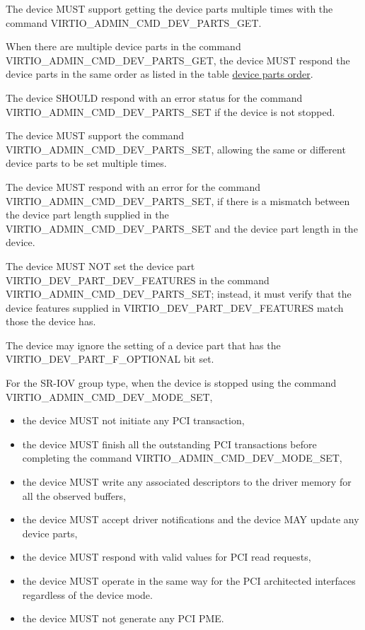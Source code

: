 The device MUST support getting the device parts multiple times
with the command VIRTIO_ADMIN_CMD_DEV_PARTS_GET.

When there are multiple device parts in the command
VIRTIO_ADMIN_CMD_DEV_PARTS_GET, the device MUST respond the device parts in the
same order as listed in the table
\hyperref[table:Basic Facilities of a Virtio Device / Device groups / Group administration commands / Device parts / Device parts order/ Device parts order]{device parts order}.

The device SHOULD respond with an error status for the command
VIRTIO_ADMIN_CMD_DEV_PARTS_SET if the device is not stopped.

The device MUST support the command VIRTIO_ADMIN_CMD_DEV_PARTS_SET,
allowing the same or different device parts to be set multiple times.

The device MUST respond with an error for the command
VIRTIO_ADMIN_CMD_DEV_PARTS_SET, if there is a mismatch between the
device part length supplied in the VIRTIO_ADMIN_CMD_DEV_PARTS_SET
and the device part length in the device.

The device MUST NOT set the device part VIRTIO_DEV_PART_DEV_FEATURES in
the command VIRTIO_ADMIN_CMD_DEV_PARTS_SET; instead,
it must verify that the device features supplied in
VIRTIO_DEV_PART_DEV_FEATURES match those the device has.

The device may ignore the setting of a device part that has the
VIRTIO_DEV_PART_F_OPTIONAL bit set.

For the SR-IOV group type, when the device is stopped using the command
VIRTIO_ADMIN_CMD_DEV_MODE_SET,
\begin{itemize}
\item the device MUST not initiate any PCI transaction,
\item the device MUST finish all the outstanding PCI transactions before completing
      the command VIRTIO_ADMIN_CMD_DEV_MODE_SET,
\item the device MUST write any associated descriptors to the driver memory for
      all the observed buffers,
\item the device MUST accept driver notifications and the device MAY update any
      device parts,
\item the device MUST respond with valid values for PCI read requests,
\item the device MUST operate in the same way for the PCI architected interfaces
      regardless of the device mode.
\item the device MUST not generate any PCI PME.
\end{itemize}

